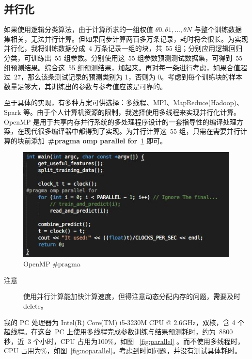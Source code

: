 \documentclass[hyperref, UTF8]{ctexart}
\begin{document}
\subsection{并行化}

如果使用逻辑分类算法，由于计算所求的一组权值 $\theta{0}, \theta{1}, ..., \theta{N}$ 与整个训练数据集相关，无法并行计算。但如果同步计算两百多万条记录，耗时将会很长。为实现并行化，我将训练数据分成\ 4 万条记录一组的块，共\ 55 组；分别应用逻辑回归分类，可训练出\ 55 组参数。分别使用这\ 55 组参数预测测试数据集，可得到\ 55 组预测结果。综合这\ 55 组预测结果，加起来。再对每一条进行考虑，如果合值超过\ 27，那么该条测试记录的预测类别为 1，否则为 0。考虑到每个训练块的样本数量足够大，其训练出的参数与参考值应该是可靠的。

至于具体的实现，有多种方案可供选择：多线程、MPI、MapReduce(Hadoop)、Spark 等。由于个人计算机资源的限制，我选择使用多线程来实现并行化计算。OpenMP 是用于共享内存并行系统的多处理程序设计的一套指导性的编译处理方案，在现代很多编译器中都得到了实现。为并行计算这\ 55 组，只需在需要并行计算的块前添加\ \textbf{\#pragma omp parallel for}~\ref{code:openmp} 即可。

\begin{figure}[H]
	\centering
	\includegraphics[width=384pt]{../results/code-openmp.jpg}
	\caption{OpenMP \#pragma}
	\label{code:openmp}
\end{figure}

\begin{description}
	\item [注意] 使用并行计算能加快计算速度，但得注意动态分配内存的问题，需要及时 delete。
\end{description}

我的 PC 处理器为 Intel(R) Core(TM) i5-3230M CPU @ 2.6GHz，双核，含 4 个超线程。在这台\ PC 上使用多线程完成参数训练与结果预测耗时，约为\ 8800 秒，近\ 3 个小时，CPU 占用为100\%，如图 ~\ref{fig:parallel} 。而不使用多线程时，CPU 占用为\%，如图~\ref{fig:noparallel}。考虑到时间问题，并没有测试具体耗时。
\end{document}
